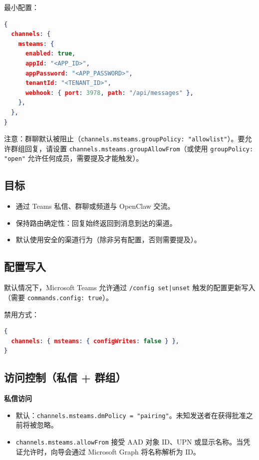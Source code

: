 最小配置：

\begin{lstlisting}[language=json]
{
  channels: {
    msteams: {
      enabled: true,
      appId: "<APP_ID>",
      appPassword: "<APP_PASSWORD>",
      tenantId: "<TENANT_ID>",
      webhook: { port: 3978, path: "/api/messages" },
    },
  },
}
\end{lstlisting}


注意：群聊默认被阻止（\texttt{channels.msteams.groupPolicy: "allowlist"}）。要允许群组回复，请设置 \texttt{channels.msteams.groupAllowFrom}（或使用 \texttt{groupPolicy: "open"} 允许任何成员，需要提及才能触发）。

\subsection{目标}


\begin{itemize}
  \item 通过 Teams 私信、群聊或频道与 OpenClaw 交流。
  \item 保持路由确定性：回复始终返回到消息到达的渠道。
  \item 默认使用安全的渠道行为（除非另有配置，否则需要提及）。
\end{itemize}


\subsection{配置写入}


默认情况下，Microsoft Teams 允许通过 \texttt{/config set|unset} 触发的配置更新写入（需要 \texttt{commands.config: true}）。

禁用方式：

\begin{lstlisting}[language=json]
{
  channels: { msteams: { configWrites: false } },
}
\end{lstlisting}


\subsection{访问控制（私信 + 群组）}


\textbf{私信访问}

\begin{itemize}
  \item 默认：\texttt{channels.msteams.dmPolicy = "pairing"}。未知发送者在获得批准之前将被忽略。
  \item \texttt{channels.msteams.allowFrom} 接受 AAD 对象 ID、UPN 或显示名称。当凭证允许时，向导会通过 Microsoft Graph 将名称解析为 ID。
\end{itemize}


